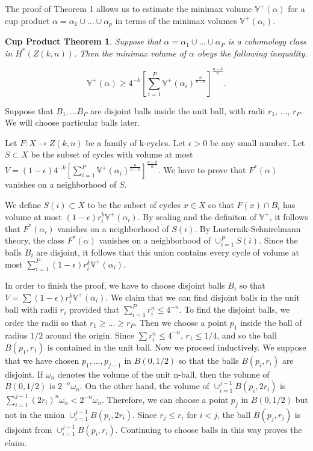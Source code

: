 \documentclass{amsart}
\newtheorem*{Theorem 1}{Theorem 1}
\newtheorem*{Theorem 2}{Theorem 2}
\newtheorem*{Theorem 1A}{Theorem 1A}
\newtheorem*{Theorem 2A}{Theorem 2A}
\newtheorem*{theoremcp}{Cup Product Theorem}
\newtheorem*{vanishing lemma}{Vanishing Lemma}
\numberwithin{equation}{section}
\begin{document}
The proof of Theorem 1 allows us to estimate the minimax volume
$\mathbb{V}^+(\alpha)$ for a cup product $\alpha = \alpha_1 \cup
... \cup \alpha_p$ in terms of the minimax volumes
$\mathbb{V}^+(\alpha_i)$.

\begin{theoremcp} Suppose that $\alpha = \alpha_1 \cup ... \cup
\alpha_P$ is a cohomology class in $H^*(Z(k,n))$.  Then the
minimax volume of $\alpha$ obeys the following inequality.

$$\mathbb{V}^+(\alpha) \ge 4^{-k} [\sum_{i=1}^P
\mathbb{V}^+(\alpha_i)^{\frac{n}{n-k}}]^{\frac{n-k}{n}}.$$
\end{theoremcp}

\proof Suppose that $B_1, ... B_P$ are disjoint balls inside the
unit ball, with radii $r_1$, ..., $r_P$.  We will choose
particular balls later.

Let $F: X \rightarrow Z(k,n)$ be a family of k-cycles.  Let
$\epsilon > 0$ be any small number.  Let $S
\subset X$ be the subset of cycles with volume at most $V = (1 - \epsilon)
4^{-k} [\sum_{i=1}^P
\mathbb{V}^+(\alpha_i)^{\frac{n}{n-k}}]^{\frac{n-k}{n}}$.  We
have to prove that $F^*(\alpha)$ vanishes on a neighborhood of
$S$.

We define $S(i) \subset X$ to be the subset of cycles $x \in X$
so that $F(x) \cap B_i$ has volume at most $(1 - \epsilon) r_i^k
\mathbb{V}^+(\alpha_i)$.  By scaling and the definiton of
$\mathbb{V}^+$, it follows that $F^*(\alpha_i)$ vanishes on a
neighborhood of $S(i)$.  By Lusternik-Schnirelmann theory, the
class $F^*(\alpha)$ vanishes on a neighborhood of $\cup_{i=1}^P
S(i)$.  Since the balls $B_i$ are disjoint, it follows that this
union contains every cycle of volume at most $\sum_{i=1}^P (1 - \epsilon)
r_i^k \mathbb{V}^+(\alpha_i)$.

In order to finish the proof, we have to choose disjoint balls
$B_i$ so that $V = \sum (1 - \epsilon) r_i^k
\mathbb{V}^+(\alpha_i)$.  We claim that we can find disjoint
balls in the unit ball with radii $r_i$ provided that
$\sum_{i=1}^P r_i^n \le 4^{-n}$.  To find the disjoint balls, we
order the radii so that $r_1 \ge ... \ge r_P$. Then we choose a
point $p_1$ inside the ball of radius $1/2$ around the origin. 
Since $\sum r_i^n \le 4^{-n}$, $r_1 \le 1/4$, and so the ball
$B(p_1, r_1)$ is contained in the unit ball.  Now we proceed
inductively.  We suppose that we have chosen $p_1, ..., p_{j-1}$
in $B(0, 1/2)$ so that the balls $B(p_i, r_i)$ are disjoint.  If
$\omega_n$ denotes the volume of the unit n-ball, then the volume
of $B(0,1/2)$ is $2^{-n} \omega_n$. On the other hand, the
volume of $\cup_{i=1}^{j-1} B(p_i, 2 r_i)$ is $\sum_{i=1}^{j-1}
(2 r_i)^n \omega_n < 2^{-n} \omega_n$. Therefore, we can choose
a point $p_j$ in $B(0, 1/2)$ but not in the union
$\cup_{i=1}^{j-1} B(p_i, 2 r_i)$.  Since $r_j \le r_i$ for $i <
j$, the ball $B(p_j, r_j)$ is disjoint from $\cup_{i=1}^{j-1}
B(p_i, r_i)$.  Continuing to choose balls in this way proves the
claim.
\end{document}
